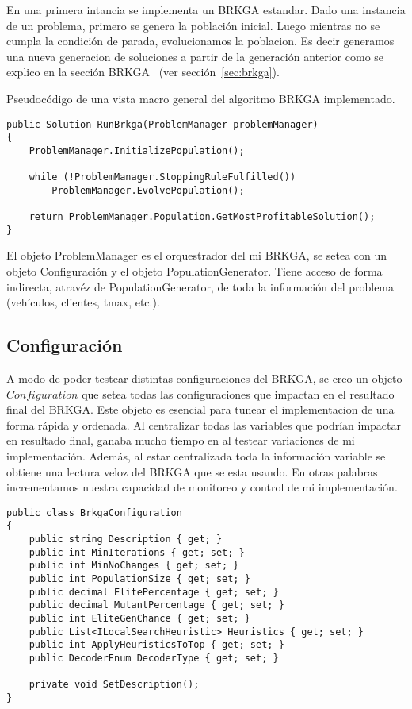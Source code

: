 En una primera intancia se implementa un BRKGA estandar. Dado una instancia de un problema, primero se genera la población inicial. Luego mientras no se cumpla la condición de parada, evolucionamos la poblacion. Es decir generamos una nueva generacion de soluciones a partir de la generación anterior como se explico en la sección BRKGA ~(ver sección~\ref{sec:brkga}).

\bigskip

Pseudocódigo de una vista macro general del algoritmo BRKGA implementado.

\bigskip

\begin{minipage}{\textwidth}
\begin{lstlisting} 
public Solution RunBrkga(ProblemManager problemManager)
{
    ProblemManager.InitializePopulation();

    while (!ProblemManager.StoppingRuleFulfilled())
        ProblemManager.EvolvePopulation();

    return ProblemManager.Population.GetMostProfitableSolution();
}
\end{lstlisting}
\end{minipage}

\bigskip

El objeto ProblemManager es el orquestrador del mi BRKGA, se setea con un objeto Configuración y el objeto PopulationGenerator. Tiene acceso de forma indirecta, atravéz de PopulationGenerator, de toda la información del problema (vehículos, clientes, tmax, etc.).

\subsection{Configuración}

A modo de poder testear distintas configuraciones del BRKGA, se creo un objeto $Configuration$ que setea todas las configuraciones que impactan en el resultado final del BRKGA. Este objeto es esencial para tunear el implementacion de una forma rápida y ordenada. Al centralizar todas las variables que podrían impactar en resultado final, ganaba mucho tiempo en al testear variaciones de mi implementación. Además, al estar centralizada toda la información variable se obtiene una lectura veloz del BRKGA que se esta usando. En otras palabras incrementamos nuestra capacidad de monitoreo y control de mi implementación.

\bigskip

\begin{minipage}{\textwidth}
\begin{lstlisting}
public class BrkgaConfiguration
{
	public string Description { get; }
	public int MinIterations { get; set; }
	public int MinNoChanges { get; set; }
	public int PopulationSize { get; set; }
	public decimal ElitePercentage { get; set; }
	public decimal MutantPercentage { get; set; }
	public int EliteGenChance { get; set; }
	public List<ILocalSearchHeuristic> Heuristics { get; set; }
	public int ApplyHeuristicsToTop { get; set; }
	public DecoderEnum DecoderType { get; set; }
	
	private void SetDescription();
}
\end{lstlisting}
\end{minipage}

